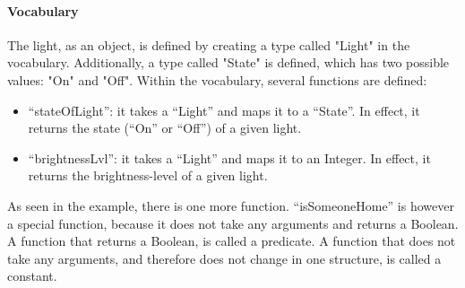 \documentclass[11pt,a4paper]{report}
\begin{document}
\paragraph{Vocabulary}
The light, as an object, is defined by creating a type called "Light" in the vocabulary. Additionally, a type called "State" is defined, which has two possible values: "On" and "Off". Within the vocabulary, several functions are defined:
\begin{itemize}
    \item ``stateOfLight'': it takes a ``Light'' and maps it to a ``State''. In effect, it returns the state (``On'' or ``Off'') of a given light.
    \item ``brightnessLvl'': it takes a ``Light'' and maps it to an Integer. In effect, it returns the brightness-level of a given light.
\end{itemize}
As seen in the example, there is one more function. ``isSomeoneHome'' is however a special function, because it does not take any arguments and returns a Boolean. A function that returns a Boolean, is called a predicate. A function that does not take any arguments, and therefore does not change in one structure, is called a constant.
\end{document}
